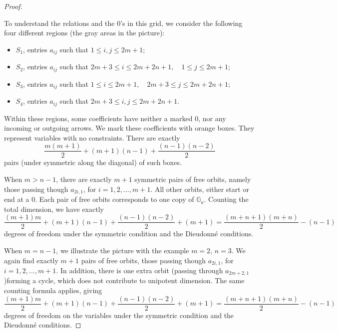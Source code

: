 \documentclass[a4paper,12pt,twoside]{report}
\newcommand{\G}{\mathbb{G}}
\begin{document}
\begin{proof}
\begin{center}
    \end{center}

    To understand the relations and the $0$'s in this grid, 
    we consider the following four different regions (the gray areas in the picture): 
    \begin{itemize}
        \item $S_1$, entries $a_{ij}$ such that $1\leqslant i,j\leqslant 2m+1$;
        \item  $S_2$, entries $a_{ij}$ such that $2m+3\leqslant i\leqslant 2m+2n+1, \quad 1\leqslant j\leqslant 2m+1$;
        \item  $S_3$, entries $a_{ij}$ such that $1\leqslant i\leqslant 2m+1, \quad 2m+3\leqslant j\leqslant 2m+2n+1$;
        \item  $S_4$, entries $a_{ij}$ such that $ 2m+3\leqslant i,j\leqslant 2m+2n+1$.
    \end{itemize}

    
    Within these regions, some coefficients have neither a marked $0$, nor any incoming or outgoing arrows. 
    We mark these coefficients with orange boxes. 
    They represent variables with no constraints. 
    There are exactly \[\frac{m(m+1)}{2}+(m+1)(n-1)+\frac{(n-1)(n-2)}{2}\] pairs (under symmetric along the diagonal) of such boxes. 

    When $m>n-1$, there are exactly $m+1$ symmetric pairs of free orbits, 
    namely those passing though $a_{2i,1}$, for $i=1,2,...,m+1$. 
    All other orbits, either start or end at a $0$. 
    Each pair of free orbits corresponds to one copy of $\G_a$.
    Counting the total dimension, we have exactly
    \[\frac{(m+1)m}{2}+(m+1)(n-1)+\frac{(n-1)(n-2)}{2}+(m+1)=\frac{(m+n+1)(m+n)}{2}-(n-1)\]
    degrees of freedom under the symmetric condition and the Dieudonn\'e conditions. 
    
    When $m=n-1$, we illustrate the picture with the example $m=2$, $n=3$. 
    We again find exactly $m+1$ pairs of free orbits, 
    those passing though $a_{2i,1}$, for $i=1,2,...,m+1$.
    In addition, there is one extra orbit (passing through $a_{2m+2,1}$)forming a cycle, 
    which does not contribute to unipotent dimension. 
    The same counting formula applies, giving 
    \[\frac{(m+1)m}{2}+(m+1)(n-1)+\frac{(n-1)(n-2)}{2}+(m+1)=\frac{(m+n+1)(m+n)}{2}-(n-1)\]
    degrees of freedom on the variables under the symmetric condition and the Dieudonn\'e conditions. 
    

\end{proof}
\end{document}
